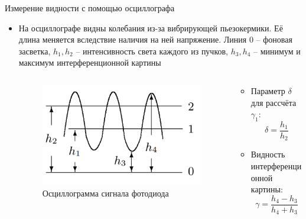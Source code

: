 \documentclass[11pt]{beamer} %
\begin{document}
    \begin{frame}{Измерение видности с помощью осциллографа}
    \begin{itemize}
        \item На осциллографе видны колебания из-за вибрирующей пьезокермики. Её длина меняется вследствие наличия на ней напряжение. Линия $0$ -- фоновая засветка, $h_1, h_2$ -- интенсивность света каждого из пучков, $h_3, h_4$ -- минимум и максимум интерференционной картины
        \begin{columns}[T]
            \begin{column}{0.5\textwidth}
                \centering
                \begin{figure}
                    \includegraphics[width=\textwidth]{images/blabla.png}
                    \caption{Осциллограмма сигнала фотодиода}
                    \label{fig:osc}
                \end{figure}
            \end{column}
    
            \begin{column}{0.5\textwidth}
        
                \centering
                \small
                \begin{itemize}
                    \item Параметр $\delta$ для рассчёта $\gamma_1$:
                    \begin{equation}
                        \delta = \frac{h_1}{h_2}
                    \end{equation}
                    \item Видность интерференционной картины:
                    \begin{equation}
                        \gamma = \frac{h_4 - h_3}{h_4 + h_3}
                    \end{equation}
                \end{itemize}
                
            \end{column}%
        \end{columns}
    \end{itemize}
        
    \end{frame}
    
\end{document}
